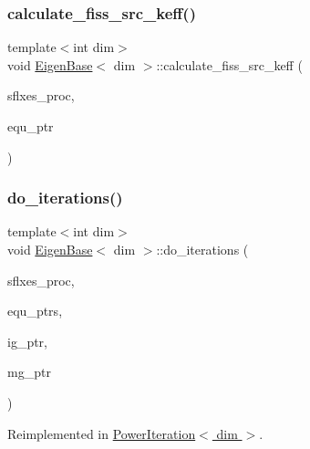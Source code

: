 \subsubsection{\texorpdfstring{calculate\+\_\+fiss\+\_\+src\+\_\+keff()}{calculate\_fiss\_src\_keff()}}
{\footnotesize\ttfamily template$<$int dim$>$ \\
void \hyperlink{class_eigen_base}{Eigen\+Base}$<$ dim $>$\+::calculate\+\_\+fiss\+\_\+src\+\_\+keff (\begin{DoxyParamCaption}\item[{std\+::vector$<$ Vector$<$ double $>$ $>$ \&}]{sflxes\+\_\+proc,  }\item[{std\+\_\+cxx11\+::shared\+\_\+ptr$<$ \hyperlink{class_equation_base}{Equation\+Base}$<$ dim $>$ $>$}]{equ\+\_\+ptr }\end{DoxyParamCaption})\hspace{0.3cm}{\ttfamily [protected]}}

\mbox{\label{class_eigen_base_a8a9ef8878e5b7199aa662f2b61b2d864}} 
\subsubsection{\texorpdfstring{do\+\_\+iterations()}{do\_iterations()}}
{\footnotesize\ttfamily template$<$int dim$>$ \\
void \hyperlink{class_eigen_base}{Eigen\+Base}$<$ dim $>$\+::do\+\_\+iterations (\begin{DoxyParamCaption}\item[{std\+::vector$<$ Vector$<$ double $>$ $>$ \&}]{sflxes\+\_\+proc,  }\item[{std\+::vector$<$ std\+\_\+cxx11\+::shared\+\_\+ptr$<$ \hyperlink{class_equation_base}{Equation\+Base}$<$ dim $>$ $>$ $>$ \&}]{equ\+\_\+ptrs,  }\item[{std\+\_\+cxx11\+::shared\+\_\+ptr$<$ \hyperlink{class_i_g_base}{I\+G\+Base}$<$ dim $>$ $>$}]{ig\+\_\+ptr,  }\item[{std\+\_\+cxx11\+::shared\+\_\+ptr$<$ \hyperlink{class_m_g_base}{M\+G\+Base}$<$ dim $>$ $>$}]{mg\+\_\+ptr }\end{DoxyParamCaption})\hspace{0.3cm}{\ttfamily [virtual]}}



Reimplemented in \hyperlink{class_power_iteration_a7a87263df0f1ca9e01f2647cd91461ed}{Power\+Iteration$<$ dim $>$}.

